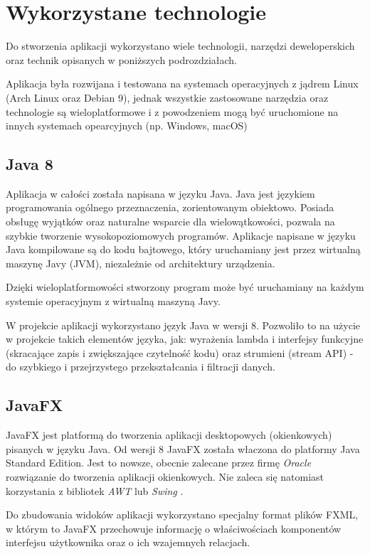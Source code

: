 \section{Wykorzystane technologie}
Do stworzenia aplikacji wykorzystano wiele technologii, narzędzi deweloperskich oraz technik opisanych w poniższych podrozdziałach.

Aplikacja była rozwijana i testowana na systemach operacyjnych z jądrem Linux (Arch Linux oraz Debian 9), jednak wszystkie zastosowane narzędzia oraz technologie są wieloplatformowe i z powodzeniem mogą być uruchomione na innych systemach opearcyjnych (np. Windows, macOS)

\subsection{Java 8}
Aplikacja w całości została napisana w języku Java.
Java jest językiem programowania ogólnego przeznaczenia, zorientowanym obiektowo. Posiada obsługę wyjątków oraz naturalne wsparcie dla wielowątkowości, pozwala na szybkie tworzenie wysokopoziomowych programów. Aplikacje napisane w języku Java kompilowane są do kodu bajtowego, który uruchamiany jest przez wirtualną maszynę Javy (JVM), niezależnie od architektury urządzenia.

Dzięki wieloplatformowości stworzony program może być uruchamiany na każdym systemie operacyjnym z wirtualną maszyną Javy.

W projekcie aplikacji wykorzystano język Java w wersji 8. 
Pozwoliło to na użycie w projekcie takich elementów języka, jak: wyrażenia lambda i interfejsy funkcyjne (skracające zapis i zwiększające czytelność kodu) oraz strumieni (stream API) - do szybkiego i przejrzystego przekształcania i filtracji danych.

\subsection{JavaFX}
JavaFX jest platformą do tworzenia aplikacji desktopowych (okienkowych) pisanych w języku Java.
Od wersji 8 JavaFX została właczona do platformy Java Standard Edition.
Jest to nowsze, obecnie zalecane przez firmę {\it Oracle} rozwiązanie do tworzenia aplikacji okienkowych. Nie zaleca się natomiast korzystania z bibliotek {\it AWT} lub {\it Swing} \cite{javafx-replacing-swing}.

Do zbudowania widoków aplikacji wykorzystano specjalny format plików FXML, w którym to JavaFX przechowuje informację o właściwościach komponentów interfejsu użytkownika oraz o ich wzajemnych relacjach.

